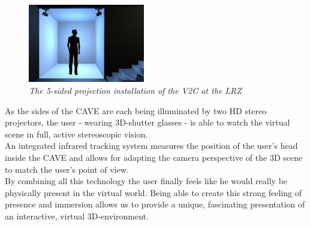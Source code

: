 \documentclass[conference]{acmsiggraph}
\begin{document}
\begin{figure}[htb]
  \centering
  \includegraphics[width=2.0in]{5_sided_cave}
  \caption[The 5-sided projection installation, source: \newline\href{http://www.lrz.de/services/v2c\_ de/bilder/5sided.jpg}{http://www.lrz.de/services/v2c\_de/bilder/5sided.jpg}]{\textit{The 5-sided projection installation of the V2C at the LRZ}}
  \label{fig:5sided}
\end{figure}

As the sides of the CAVE are each being illuminated by two HD stereo projectors, the user - wearing 3D-shutter glasses - is able to watch the virtual scene in full, active stereoscopic vision.\\
An integrated infrared tracking system measures the position of the user's head inside the CAVE and allows for adapting the camera perspective of the 3D scene to match the user's point of view.\\
By combining all this technology the user finally feels like he would really be physically present in the virtual world. Being able to create this strong feeling of presence and immersion allows us to provide a unique, fascinating presentation of an interactive, virtual 3D-environment.


\label{SEC:VISUALISATION}
\end{document}
